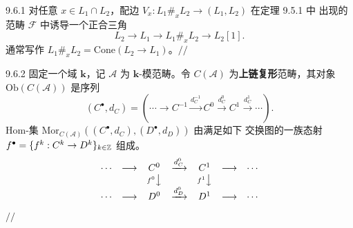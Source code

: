 
\begin{wexam}{9.6.1}
对任意 $x\in L_1\cap L_2$，配边 $V_x:L_1\#_x L_2\to(L_1,L_2)$ 在定理 9.5.1 中
出现的范畴 $\mathcal F$ 中诱导一个正合三角
\begin{equation}\tag{9.37}
L_2\to L_1\to L_1\#_x L_2\to L_2[1].
\end{equation}
通常写作 $L_1\#_x L_2=\mathrm{Cone}(L_2\to L_1)$。\hfill$//$
\end{wexam}


\begin{wexam}{9.6.2}
固定一个域 $\mathbf k$，记 $\mathcal A$ 为 $\mathbf k$-模范畴。令 $C(\mathcal A)$
为\textbf{上链复形}范畴，其对象 $\mathrm{Ob}(C(\mathcal A))$ 是序列
\[
(C^\bullet,d_C)=
\left(\cdots\to C^{-1}\xrightarrow{d_C^{-1}}C^0
\xrightarrow{d_C^0}C^1\xrightarrow{d_C^1}\cdots\right).
\]
Hom-集 $\mathrm{Mor}_{C(\mathcal A)}((C^\bullet,d_C),(D^\bullet,d_D))$ 由满足如下
交换图的一族态射 $f^\bullet=\{f^k:C^k\to D^k\}_{k\in\mathbb{Z}}$ 组成。
\[
\begin{array}{ccccccc}
\cdots & \longrightarrow & C^0 & \xrightarrow{d_C^0} & C^1 & \longrightarrow & \cdots\\
& & {\scriptstyle f^0}\big\downarrow & & {\scriptstyle f^1}\big\downarrow & & \\
\cdots & \longrightarrow & D^0 & \xrightarrow{d_D^0} & D^1 & \longrightarrow & \cdots
\end{array}
\]
\hfill$//$
\end{wexam}

